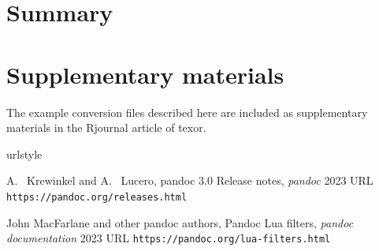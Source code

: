 \section{Summary}

\section{Supplementary materials}
The example conversion files described here are included as supplementary materials
in the Rjournal article of texor.

\begin{thebibliography}{2}
    \providecommand{\natexlab}[1]{#1}
    \providecommand{\url}[1]{\texttt{#1}}
    \expandafter\ifx\csname urlstyle\endcsname\relax
      \providecommand{\doi}[1]{doi: #1}\else
      \providecommand{\doi}{doi: \begingroup \urlstyle{rm}\Url}\fi

A.~ Krewinkel and A.~ Lucero,
\newblock pandoc 3.0 Release notes,
\newblock \emph{pandoc}  2023
\newblock URL \url{https://pandoc.org/releases.html}

John MacFarlane and other pandoc authors,
\newblock Pandoc Lua filters,
\newblock \emph{pandoc documentation}  2023
\newblock URL \url{https://pandoc.org/lua-filters.html}

\end{thebibliography}


\address{%
Abhishek Ulayil\\
Student, Institute of Actuaries of India\\%
Mumbai, India\\
ORCiD: 0009-0000-6935-8690\\
}
